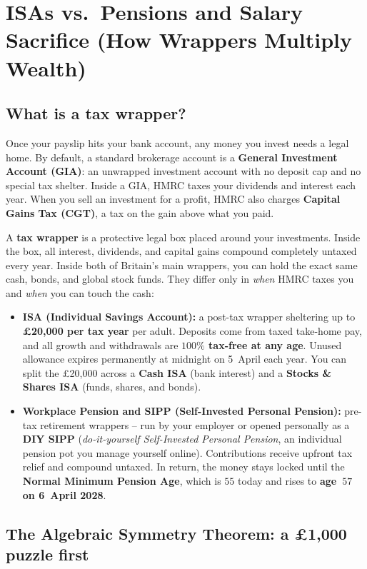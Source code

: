\section{ISAs vs.\ Pensions and Salary Sacrifice (How Wrappers Multiply Wealth)}

\subsection{What is a tax wrapper?}

Once your payslip hits your bank account, any money you invest needs a legal home. By default, a standard brokerage account is a \textbf{General Investment Account (GIA)}: an unwrapped investment account with no deposit cap and no special tax shelter. Inside a GIA, HMRC taxes your dividends and interest each year. When you sell an investment for a profit, HMRC also charges \textbf{Capital Gains Tax (CGT)}, a tax on the gain above what you paid.

A \textbf{tax wrapper} is a protective legal box placed around your investments. Inside the box, all interest, dividends, and capital gains compound completely untaxed every year. Inside both of Britain's main wrappers, you can hold the exact same cash, bonds, and global stock funds. They differ only in \emph{when} HMRC taxes you and \emph{when} you can touch the cash:
\begin{itemize}
  \item \textbf{ISA (Individual Savings Account):} a post-tax wrapper sheltering up to \textbf{\pounds 20,000 per tax year} per adult. Deposits come from taxed take-home pay, and all growth and withdrawals are \textbf{$100\%$ tax-free at any age}. Unused allowance expires permanently at midnight on 5~April each year. You can split the \pounds 20,000 across a \textbf{Cash ISA} (bank interest) and a \textbf{Stocks \& Shares ISA} (funds, shares, and bonds).
  \item \textbf{Workplace Pension and SIPP (Self-Invested Personal Pension):} pre-tax retirement wrappers -- run by your employer or opened personally as a \textbf{DIY SIPP} (\emph{do-it-yourself Self-Invested Personal Pension}, an individual pension pot you manage yourself online). Contributions receive upfront tax relief and compound untaxed. In return, the money stays locked until the \textbf{Normal Minimum Pension Age}, which is $55$ today and rises to \textbf{age~$57$ on 6~April 2028}.
\end{itemize}

\subsection{The Algebraic Symmetry Theorem: a \pounds 1,000 puzzle first}

